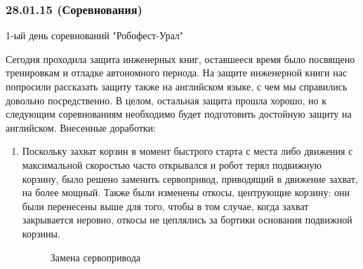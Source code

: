 \subsubsection{28.01.15 (Соревнования)}
\begin{center}
	1-ый день соревнований "Робофест-Урал"
\end{center}
Сегодня проходила защита инженерных книг, оставшееся время было посвящено тренировкам и отладке автономного периода. На защите инженерной книги нас попросили рассказать защиту также на английском языке, с чем мы справились довольно посредственно. В целом, остальная защита прошла хорошо, но к следующим соревнованиям необходимо будет подготовить достойную защиту на английском. \newline
Внесенные доработки:
\begin{enumerate}
	\item Поскольку захват корзин в момент быстрого старта с места либо движения с максимальной скоростью часто открывался и робот терял подвижную корзину, было решено заменить сервопривод, приводящий в движение захват, на более мощный. Также были изменены откосы, центрующие корзину: они были перенесены выше для того, чтобы в том случае, когда захват закрывается неровно, откосы не цеплялись за бортики основания подвижной корзины. 
	\begin{figure}[H]
		\begin{minipage}[h]{0.47\linewidth}
			\caption{Замена сервопривода}
		\end{minipage}
		\hfill
	    \begin{minipage}[h]{0.47\linewidth}

\end{minipage}
\end{figure}
\end{enumerate}
